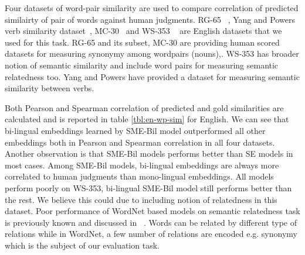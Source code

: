  Four datasets of word-pair similarity are used to compare correlation of
 predicted similairty of pair of words against human judgments.
 RG-65 ~\cite{Rubenstein1965}, Yang and Powers verb similarity
 dataset~\cite{Yang2007}, MC-30~\cite{Miller1991} and WS-353
 ~\cite{Finkelstein2001}
  are English datasets that we used for this task. RG-65 and its subset, MC-30 are providing
 human scored datasets for measuring synonymy among wordpairs (nouns),. WS-353
 has broader notion of semantic similarity and include word pairs for measuring
 semantic relatedness too. Yang and Powers have provided a dataset for measuring semantic
 similarity between verbs.
  
 
  
 Both Pearson and Spearman correlation of predicted and gold similarities 
 are calculated and is reported in table \ref{tbl:en-wp-sim} for English. We can
 see that bi-lingual embeddings learned by SME-Bil model outperformed all other
 embeddings both in Pearson and Spearman correlation in all four datasets.
 Another observation is that SME-Bil models performs better than SE
 models in most cases. Among SME-Bil models, bi-lingual embeddings are always
 more correlated to human judgments than mono-lingual embeddings.
 All models perform poorly on WS-353, bi-lingual SME-Bil model still performs
 better than the rest. We believe this could due to including notion of
 relatedness in this dataset. Poor performance of WordNet based models on
 semantic relatedness task is previously known and discussed in
 ~\cite{Szumlanski}. Words can be related by different type of relations
 while in WordNet, a few number of relations are encoded e.g. synonymy which is the
 subject of our evaluation task.
 

